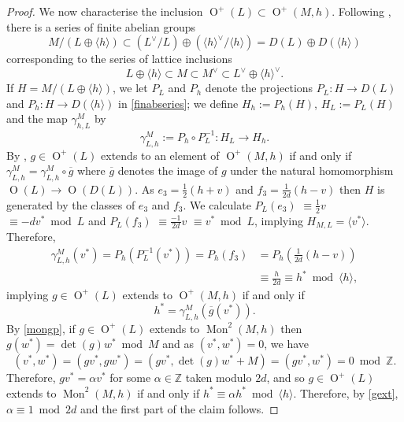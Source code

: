 \documentclass[12pt, a4paper]{article}
\newcommand{\ZZ}{\mathbb{Z}}
\newcommand{\la}{\langle}
\newcommand{\ra}{\rangle}
\newcommand{\opn}{\operatorname}
\newcommand{\op}{\oplus}
\begin{document}
\begin{proof}
We now characterise the inclusion $\opn{O}^+(L) \subset \opn{O}^+(M, h)$.
Following \cite[\S5]{Nikulin}, there is a series of finite abelian groups
\begin{equation}\label{finabseries}
  M/(L \op \la h \ra) \subset (L^{\vee}/ L) \op (\la h \ra^{\vee}/\la h \ra) = D(L) \op D(\la h \ra)
\end{equation}
corresponding to the series of lattice inclusions
\[
  L \op \la h \ra \subset M \subset M^{\vee} \subset L^{\vee} \op \la h \ra^{\vee}.
\]
If $H=M / (L \op \la h \ra )$, we let $P_L$ and $P_h$ denote the projections $P_L:H \rightarrow D(L)$ and $P_h: H \rightarrow D(\la h \ra)$ in \eqref{finabseries};
we define $H_h:=P_h(H)$, $H_{L}:=P_L(H)$ and the map $\gamma^M_{h,L}$ by  
\[
\gamma^M_{L, h}:=P_h \circ P_L^{-1}: H_{L} \rightarrow H_h.
\]
By \cite[Corollary 1.5.2]{Nikulin}, $g \in \opn{O}^+(L)$ extends to an element of $\opn{O}^+(M, h)$ if and only if $\gamma^M_{L, h} = \gamma^M_{L, h} \circ \overline{g}$ where $\overline{g}$ denotes the image of $g$ under the natural homomorphism $\opn{O}(L) \rightarrow \opn{O}(D(L))$.
As $e_3 = \frac{1}{2}(h+v)$ and $f_3 = \frac{1}{2d}(h-v)$ then $H$ is generated by the classes of $e_3$ and $f_3$.
We calculate  
$P_L(e_3)$ $\equiv \frac{1}{2} v$ $\equiv -d v^* \bmod{ L}$ and
$P_L(f_3)$ $\equiv \frac{-1}{2d}v$ $\equiv v^* \bmod{ L}$, implying $H_{M,L}=\la v^* \ra$.
Therefore, 
\begin{align*}
\gamma^M_{L, h}(v^*) = P_h(P_L^{-1}(v^*)) = P_h(f_3) & = P_h(\frac{1}{2d}(h-v)) \\
& \equiv \frac{h}{2d}   \equiv  h^* \bmod { \la h \ra}, 
\end{align*}
implying $g \in \opn{O}^+(L)$ extends to $\opn{O}^+(M, h)$ if and only if
\begin{equation}\label{gext}
h^* = \gamma^M_{L,h} (\overline{g}(v^*)).
\end{equation}
By \eqref{mongp}, if $g \in \opn{O}^+(L)$ extends to $\opn{Mon}^2(M, h)$ then $g(w^*) = \opn{det}(g) w^* \bmod{ M}$ and as $(v^*, w^*) = 0$, we have 
\begin{equation*}
  (v^*, w^*) = (gv^*, gw^*) = (gv^*, \opn{det}(g)w^* + M ) = (gv^*, w^*) = 0 \bmod{ \ZZ}.
\end{equation*}
Therefore, $gv^* = \alpha v^*$ for some $\alpha \in \ZZ$ taken modulo $2d$, and so $g \in \opn{O}^+(L)$ extends to $\opn{Mon}^2(M, h)$ if and only if $h^* \equiv \alpha h^* \bmod{ \la h \ra}$.
Therefore, by \eqref{gext}, $\alpha \equiv 1 \bmod{ 2d}$ and  the first part of the claim follows.


\end{proof}
\end{document}
